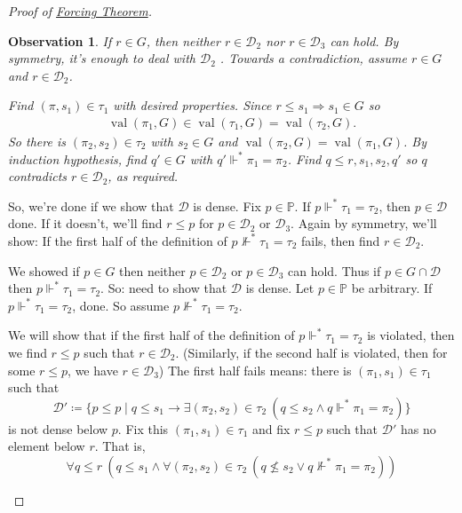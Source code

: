 \documentclass{article}
\newtheorem*{observation}{Observation}
\newcommand{\p}{\mathbb{P}}
\newcommand{\1}{\mathbbm{1}}
\DeclareMathOperator{\val}{val}
\let\forces\Vdash
\begin{document}
\begin{proof}[Proof of \hyperlink{thm:forcing}{Forcing Theorem}]
\begin{enumerate}
      \begin{observation}
        If $r \in G$, then neither $r \in \mathcal{D}_2$ nor $r \in \mathcal{D}_3$ can hold. By symmetry, it's enough to deal with $ \mathcal{D}_2$ .
        Towards a contradiction, assume $r \in G$ and $r \in \mathcal{D}_2$.

        Find $(\pi,s_1) \in \tau_1$ with desired properties.
        Since $r \leq s_1 \Rightarrow s_1 \in G$ so
        \begin{align*}
          \val(\pi_1, G) \in \val(\tau_1,G) = \val(\tau_2,G).
        \end{align*}
        So there is $(\pi_2,s_2) \in \tau_2$ with $s_2 \in G$ and $\val(\pi_2,G) = \val(\pi_1, G)$.
        By induction hypothesis, find $q' \in G$ with $q' \forces^* \pi_1 = \pi_2$.
        Find $q \leq r,s_1,s_2, q'$ so $q$ contradicts $r \in \mathcal{D}_2$, as required.
      \end{observation}

      So, we're done if we show that $\mathcal{D}$ is dense.
      Fix $p \in \p$. If $p \forces^* \tau_1 = \tau_2$, then $p \in \mathcal{D}$ done.
      If it doesn't, we'll find $r \leq p$ for $p \in \mathcal{D}_2$ or $\mathcal{D}_3$.
      Again by symmetry, we'll show: If the first half of the definition of $p \not\forces^* \tau_1 = \tau_2$ fails, then find $r \in \mathcal{D}_2 $.

      \newlec
      We showed if $p \in G$ then neither $p \in \mathcal{D}_2$ or $p \in \mathcal{D}_3$ can hold. Thus if $p \in G \cap \mathcal{D} $ then $p \forces^* \tau_1 = \tau_2$.
      So: need to show that $ \mathcal{D} $ is dense.
      Let $p \in \p$ be arbitrary. If $p \forces^* \tau_1 = \tau_2$, done. So assume $p \not\forces^* \tau_1 = \tau_2$.

      We will show that if the first half of the definition of $ p\forces^* \tau_1 = \tau_2$ is violated, then we find $r \leq p$ such that $r \in \mathcal{D} _2$. (Similarly, if the second half is violated, then for some $r \leq p$, we have $r \in \mathcal{D} _3$)
      The first half fails means:
      there is $(\pi_1,s_1) \in \tau_1$ such that
      \begin{equation*}
        \mathcal{D}' \coloneqq \{p \leq p \mid q \leq s_1 \rightarrow \exists (\pi_2,s_2) \in \tau_2 \ (q \leq s_2 \land q \forces^* \pi_1 = \pi_2)\}
      \end{equation*}
      is not dense below $p$.
      Fix this $(\pi_1, s_1) \in \tau_1$ and fix $r \leq p$ such that $\mathcal{D}'$ has no element below $r$.
      That is,
      \begin{equation*}
        \forall q \leq r \ (q \leq s_1 \land \forall (\pi_2,s_2) \in \tau_2 \ (q \nleq s_2 \lor q \not\forces^* \pi_1 = \pi_2)) \tag{$*$}\label{eq:1}
      \end{equation*}


\end{enumerate}
\end{proof}
\end{document}
